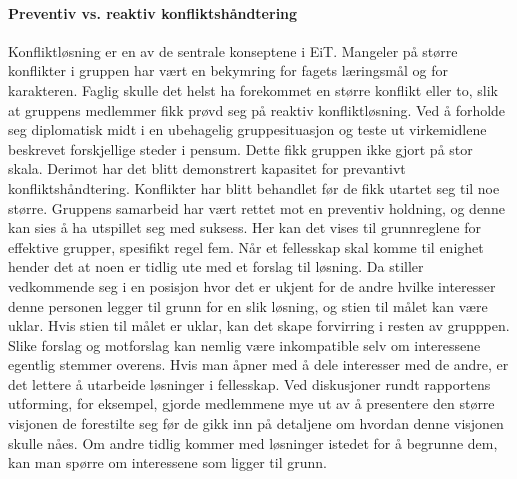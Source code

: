 \paragraph{Preventiv vs. reaktiv konfliktshåndtering}
Konfliktløsning er en av de sentrale konseptene i EiT.
Mangeler på større konflikter i gruppen har vært en bekymring for fagets læringsmål og for karakteren. 
Faglig skulle det helst ha forekommet en større konflikt eller to, slik at gruppens medlemmer fikk prøvd seg på reaktiv konfliktløsning. 
Ved å forholde seg diplomatisk midt i en ubehagelig gruppesituasjon og teste ut virkemidlene beskrevet forskjellige steder i pensum. 
Dette fikk gruppen ikke gjort på stor skala.
Derimot har det blitt demonstrert kapasitet for prevantivt konfliktshåndtering. 
Konflikter har blitt behandlet før de fikk utartet seg til noe større. 
Gruppens samarbeid har vært rettet mot en preventiv holdning, og denne kan sies å ha utspillet seg med suksess. 
Her kan det vises til grunnreglene for effektive grupper\cite{schwarz}, spesifikt regel fem. 
Når et fellesskap skal komme til enighet hender det at noen er tidlig ute med et forslag til løsning.
Da stiller vedkommende seg i en posisjon hvor det er ukjent for de andre hvilke interesser denne personen legger til  grunn for en slik løsning, og stien til målet kan være uklar. 
Hvis stien til målet er uklar, kan det skape forvirring i resten av grupppen. 
Slike forslag og motforslag kan nemlig være inkompatible selv om interessene egentlig stemmer overens.
Hvis man åpner med å dele interesser med de andre, er det lettere å utarbeide løsninger i fellesskap.
Ved diskusjoner rundt rapportens utforming, for eksempel, gjorde medlemmene mye ut av å presentere den større visjonen de forestilte seg før de gikk inn på detaljene om hvordan denne visjonen skulle nåes. 
Om andre tidlig kommer med løsninger istedet for å begrunne dem, kan man spørre om interessene som ligger til grunn.
\\